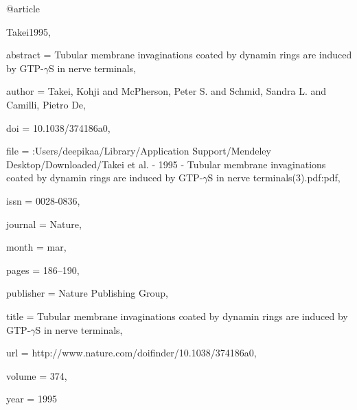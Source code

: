 @article{Takei1995,

abstract = {Tubular membrane invaginations coated by dynamin rings are induced by GTP-$\gamma$S in nerve terminals},

author = {Takei, Kohji and McPherson, Peter S. and Schmid, Sandra L. and Camilli, Pietro De},

doi = {10.1038/374186a0},

file = {:Users/deepikaa/Library/Application Support/Mendeley Desktop/Downloaded/Takei et al. - 1995 - Tubular membrane invaginations coated by dynamin rings are induced by GTP-$\gamma$S in nerve terminals(3).pdf:pdf},

issn = {0028-0836},

journal = {Nature},

month = {mar},

pages = {186--190},

publisher = {Nature Publishing Group},

title = {{Tubular membrane invaginations coated by dynamin rings are induced by GTP-$\gamma$S in nerve terminals}},

url = {http://www.nature.com/doifinder/10.1038/374186a0},

volume = {374},

year = {1995}

}


